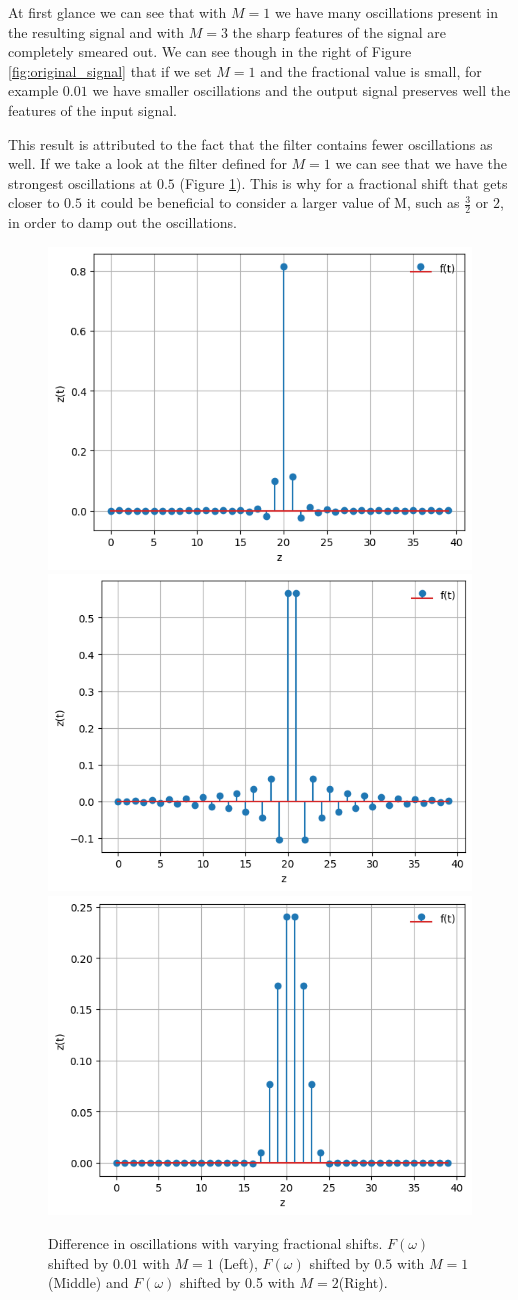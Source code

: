 \documentclass[]{usiinfbachelorproject}
\begin{document}
		At first glance we can see that with $M=1$ we have  many oscillations present in the resulting signal and with $M=3$ the sharp features of the signal are completely smeared out. We can see though in the right of Figure \ref{fig:original_signal} that if we set $M=1$ and the fractional value is small, for example $0.01$ we have smaller oscillations and the output signal preserves well the features of the input signal.
		
		This result is attributed to the fact that the filter contains fewer oscillations as well. If we take a look at the filter defined for $M=1$ we can see that we have the strongest oscillations at $0.5$ (Figure \ref{fig:different_shifts_small_M}). 
		This is why for a fractional shift that gets closer to $0.5$ it could be beneficial to consider a larger value of M, such as $\frac{3}{2}$ or $2$, in order to damp out the oscillations.
		\begin{figure}
			\centering
			\includegraphics[width=0.33\columnwidth]{images/Results/M_1_filter_small_shift.png}
			\includegraphics[width=0.33\columnwidth]{images/Results/M_1_filter_big_shift.png}
			\includegraphics[width=0.33\columnwidth]{images/Results/M_2_filter_big_shift.png}
			\caption{Difference in oscillations with varying fractional shifts. $F(\omega)$ shifted by $0.01$ with $M=1$ (Left), $F(\omega)$ shifted by $0.5$ with $M=1$ (Middle) and $F(\omega)$ shifted by 0.5 with $M=2$(Right).}
			\label{fig:different_shifts_small_M}
		\end{figure}
		
\end{document}
